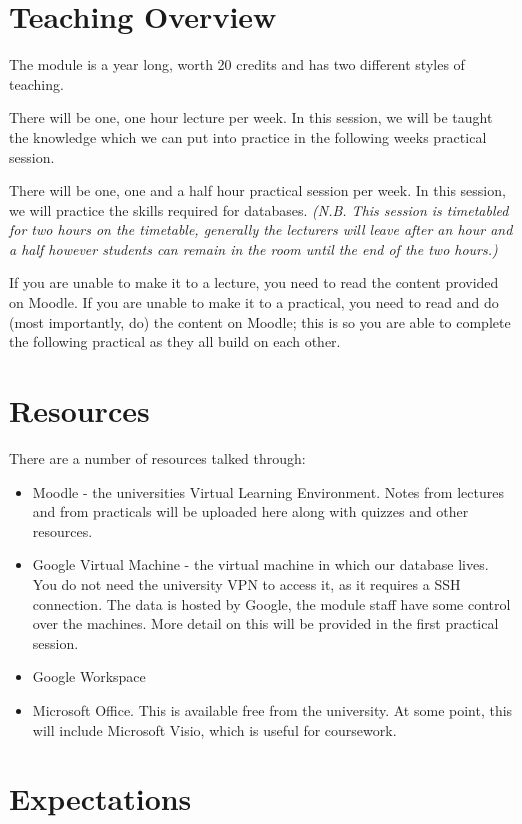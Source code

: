\section*{Teaching Overview}
The module is a year long, worth 20 credits and has two different styles of teaching.

There will be one, one hour lecture per week. In this session, we will be taught the knowledge which we can put into practice in the following weeks practical session.

There will be one, one and a half hour practical session per week. In this session, we will practice the skills required for databases. \textit{(N.B. This session is timetabled for two hours on the timetable, generally the lecturers will leave after an hour and a half however students can remain in the room until the end of the two hours.)}

If you are unable to make it to a lecture, you need to read the content provided on Moodle. If you are unable to make it to a practical, you need to read and do (most importantly, do) the content on Moodle; this is so you are able to complete the following practical as they all build on each other.

\section*{Resources}
There are a number of resources talked through:
\begin{itemize}
    \item Moodle - the universities Virtual Learning Environment. Notes from lectures and from practicals will be uploaded here along with quizzes and other resources.
    \item Google Virtual Machine - the virtual machine in which our database lives. You do not need the university VPN to access it, as it requires a SSH connection. The data is hosted by Google, the module staff have some control over the machines. More detail on this will be provided in the first practical session.
    \item Google Workspace
    \item Microsoft Office. This is available free from the university. At some point, this will include Microsoft Visio, which is useful for coursework.
\end{itemize}

\section*{Expectations}
